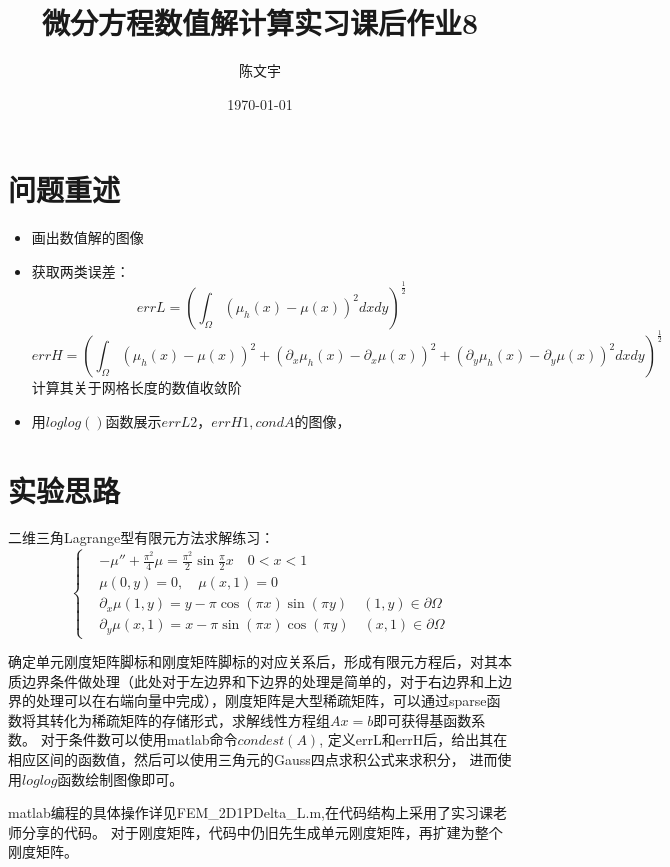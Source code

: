 \documentclass{article}
\title{微分方程数值解计算实习课后作业8}
\author{陈文宇}
\date{\today}
\begin{document}
\maketitle

\tableofcontents

\newpage
\section{问题重述}

\begin{itemize}
    \item 画出数值解的图像
    \item 获取两类误差：
    $$ errL=(\int_{\Omega}(\mu_{h}(x)-\mu(x))^{2}dxdy)^{\frac{1}{2}}$$
    $$ errH=(\int_{\Omega}(\mu_{h}(x)-\mu(x))^{2}+(\partial_{x}\mu_{h}(x)-\partial_{x}\mu(x))^{2}+(\partial_{y}\mu_{h}(x)-\partial_{y}\mu(x))^{2}dxdy)^{\frac{1}{2}}$$
    计算其关于网格长度的数值收敛阶
    \item 用$loglog()$函数展示$errL2，errH1,condA$的图像，
\end{itemize}
 
\section{实验思路}
二维三角Lagrange型有限元方法求解练习：
\[
\left\{
\begin{aligned}
	&-\mu '' + \frac{\pi^{2}}{4}\mu = \frac{\pi^{2}}{2}\sin{\frac{\pi}{2}x} \quad0<x<1 
	\\
	&\mu(0,y)=0 ,\quad \mu(x,1)=0 
        \\
        &\partial_{x}\mu(1,y)=y-\pi\cos(\pi x)\sin(\pi y) \quad (1,y)\in\partial\Omega
        \\
        &\partial_{y}\mu(x,1)=x-\pi\sin(\pi x)\cos(\pi y) \quad (x,1)\in\partial\Omega
\end{aligned}
\right.
\]

确定单元刚度矩阵脚标和刚度矩阵脚标的对应关系后，形成有限元方程后，对其本质边界条件做处理（此处对于左边界和下边界的处理是简单的，对于右边界和上边界的处理可以在右端向量中完成），刚度矩阵是大型稀疏矩阵，可以通过sparse函数将其转化为稀疏矩阵的存储形式，求解线性方程组$Ax=b$即可获得基函数系数。
对于条件数可以使用matlab命令$condest(A)$,
定义errL和errH后，给出其在相应区间的函数值，然后可以使用三角元的Gauss四点求积公式来求积分，
进而使用$loglog$函数绘制图像即可。

matlab编程的具体操作详见FEM\_2D1PDelta\_L.m,在代码结构上采用了实习课老师分享的代码。
对于刚度矩阵，代码中仍旧先生成单元刚度矩阵，再扩建为整个刚度矩阵。
\end{document}
